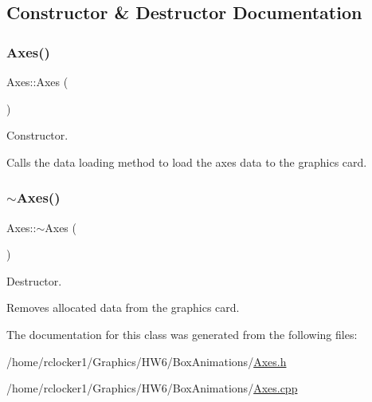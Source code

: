 \subsection{Constructor \& Destructor Documentation}
\mbox{\label{class_axes_a267a0b09346b4f3fb7ef92383f1f1d30}} 
\subsubsection{\texorpdfstring{Axes()}{Axes()}}
{\footnotesize\ttfamily Axes\+::\+Axes (\begin{DoxyParamCaption}{ }\end{DoxyParamCaption})}



Constructor. 

Calls the data loading method to load the axes data to the graphics card. \mbox{\label{class_axes_a2501d30bd3ac0031a22dbaa3fb377ed3}} 
\subsubsection{\texorpdfstring{$\sim$\+Axes()}{~Axes()}}
{\footnotesize\ttfamily Axes\+::$\sim$\+Axes (\begin{DoxyParamCaption}{ }\end{DoxyParamCaption})}



Destructor. 

Removes allocated data from the graphics card. 

The documentation for this class was generated from the following files\+:\begin{DoxyCompactItemize}
\item 
/home/rclocker1/\+Graphics/\+H\+W6/\+Box\+Animations/\hyperlink{_axes_8h}{Axes.\+h}\item 
/home/rclocker1/\+Graphics/\+H\+W6/\+Box\+Animations/\hyperlink{_axes_8cpp}{Axes.\+cpp}\end{DoxyCompactItemize}
